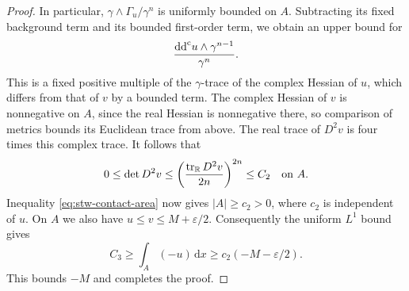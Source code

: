 \begin{proof}
In particular, $\gamma\wedge\Gamma_u/\gamma^n$ is uniformly bounded on $A$. Subtracting its fixed background term and its bounded first-order term, we obtain an upper bound for
\[
 \frac{\mathrm{dd}^{\mathrm{c}} u\wedge\gamma^{n-1}}{\gamma^n}.
\]
This is a fixed positive multiple of the $\gamma$-trace of the complex Hessian of $u$, which differs from that of $v$ by a bounded term. The complex Hessian of $v$ is nonnegative on $A$, since the real Hessian is nonnegative there, so comparison of metrics bounds its Euclidean trace from above. The real trace of $D^2v$ is four times this complex trace. It follows that
\[
 0\leq\det D^2v
 \leq\left(\frac{\operatorname{tr}_{\mathbb R}D^2v}{2n}\right)^{2n}
 \leq C_2\quad\hbox{on }A.
\]
Inequality \eqref{eq:stw-contact-area} now gives $|A|\geq c_2>0$, where $c_2$ is independent of $u$. On $A$ we also have $u\leq v\leq M+\varepsilon/2$. Consequently the uniform $L^1$ bound gives
\[
 C_3\geq\int_A(-u)\,\mathrm{d}x
       \geq c_2(-M-\varepsilon/2).
\]
This bounds $-M$ and completes the proof.
\end{proof}
